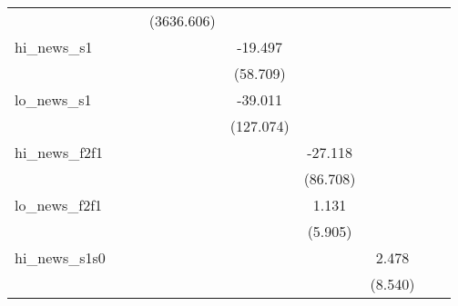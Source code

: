 {\begin{tabular}{l*{8}{c}}
            &                     &                     &  (3636.606)         &                     &                     &                     &                     &                     \\
\addlinespace
hi\_news\_s1  &                     &                     &                     &     -19.497         &                     &                     &                     &                     \\
            &                     &                     &                     &    (58.709)         &                     &                     &                     &                     \\
\addlinespace
lo\_news\_s1  &                     &                     &                     &     -39.011         &                     &                     &                     &                     \\
            &                     &                     &                     &   (127.074)         &                     &                     &                     &                     \\
\addlinespace
hi\_news\_f2f1&                     &                     &                     &                     &     -27.118         &                     &                     &                     \\
            &                     &                     &                     &                     &    (86.708)         &                     &                     &                     \\
\addlinespace
lo\_news\_f2f1&                     &                     &                     &                     &       1.131         &                     &                     &                     \\
            &                     &                     &                     &                     &     (5.905)         &                     &                     &                     \\
\addlinespace
hi\_news\_s1s0&                     &                     &                     &                     &                     &       2.478         &                     &                     \\
            &                     &                     &                     &                     &                     &     (8.540)         &                     &                     \\

\end{tabular}}
